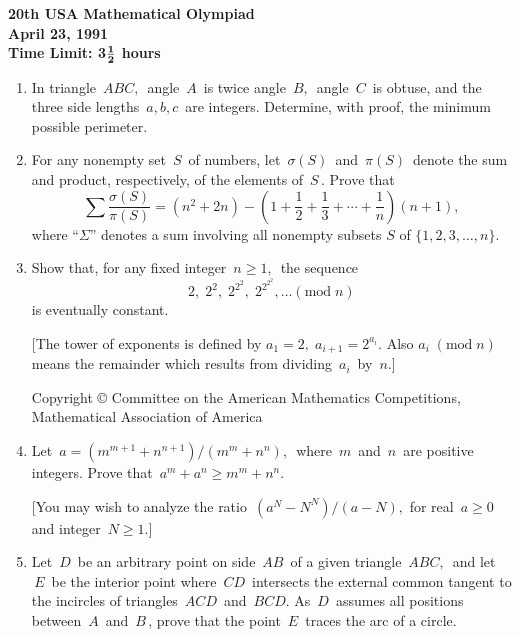 
\setlength{\baselineskip}{.25in}

\begin{center}
{\bf 20th USA Mathematical Olympiad} \\[.1in]
{\bf April 23, 1991}\\
{\bf Time Limit: 3}${{\bf 1}\over{\bf 2}}$ {\bf
hours}
\end{center}
\begin{enumerate}
\item
In triangle $\, ABC, \,$ angle $\,A\,$ is twice angle $\,B,\,$
angle $\,C\,$ is obtuse, and the three side lengths $\,a,b,c\,$ are
integers.  Determine, with proof, the minimum possible perimeter.
\item
For any nonempty set $\,S\,$ of numbers, let $\,\sigma(S)\,$ and
$\,\pi(S)\,$ denote the sum and product, respectively, of the
elements of $\,S\,$.  Prove that
\[
\sum \frac{\sigma(S)}{\pi(S)} = (n^2 + 2n) - \left(
1 + \frac{1}{2} + \frac{1}{3} + \cdots + \frac{1}{n} \right)
(n+1),
\]
where ``$\Sigma$'' denotes a sum involving all nonempty subsets
$S$ of \newline
$\{1,2,3, \ldots,n\}$.
\item
Show that, for any fixed integer $\,n \geq 1,\,$ the sequence
\[
2, \; 2^2, \; 2^{2^2}, \; 2^{2^{2^2}}, \ldots  (\mbox{mod} \; n)
\]
is eventually constant. 

[The tower of exponents is defined by $a_1 = 2, \; a_{i+1} =
2^{a_i}$.
Also $a_i \; (\mbox{mod} \; n)$ means the remainder which results
from dividing $\,a_i\,$ by $\,n$.]
\vspace*{\fill}
\begin{center}
{\footnotesize Copyright \copyright \hspace{.05in} Committee on
the American
Mathematics Competitions, Mathematical Association of America}
\end{center}
\pagebreak
\item
Let $\, a =(m^{m+1} + n^{n+1})/(m^m + n^n), \,$ where $\,m\,$ and
$\,n\,$
are positive integers.  Prove that $\,a^m + a^n \geq m^m +
n^n$. 

[You may wish to analyze the ratio $\,(a^N - N^N)/(a-N),$ for 
real $\, a \geq 0 \,$ and integer $\, N \geq 1$.]
\item
Let $\, D \,$ be an arbitrary point on side $\, AB \,$ of a given
triangle
$\, ABC, \,$ and let $\, E \,$ be the interior point where 
$\, CD \,$ intersects
the external common tangent to the incircles of triangles $\,
ACD \,$
and $\, BCD$.  As $\, D \,$ assumes all positions between $\, A
\,$ and $\, B \,$,
prove that the point $\, E \, $ traces the arc of a circle.
\end{enumerate}
